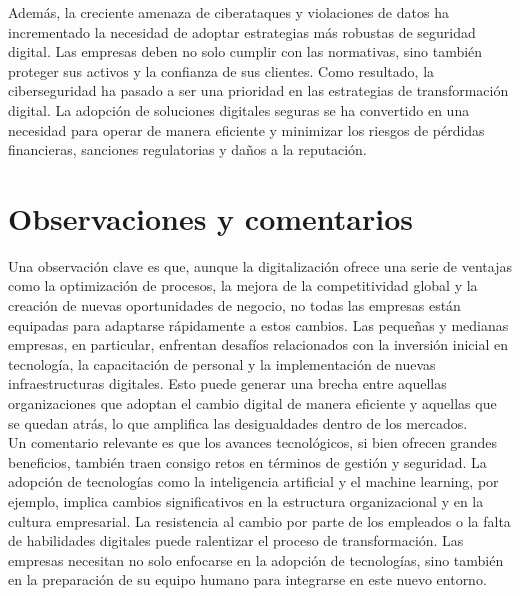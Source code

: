 \documentclass{article}
\begin{document}
Además, la creciente amenaza de ciberataques y violaciones de datos ha incrementado la necesidad de adoptar estrategias más robustas de seguridad digital. Las empresas deben no solo cumplir con las normativas, sino también proteger sus activos y la confianza de sus clientes. Como resultado, la ciberseguridad ha pasado a ser una prioridad en las estrategias de transformación digital. La adopción de soluciones digitales seguras se ha convertido en una necesidad para operar de manera eficiente y minimizar los riesgos de pérdidas financieras, sanciones regulatorias y daños a la reputación.\\

\section{Observaciones y comentarios}
Una observación clave es que, aunque la digitalización ofrece una serie de ventajas como la optimización de procesos, la mejora de la competitividad global y la creación de nuevas oportunidades de negocio, no todas las empresas están equipadas para adaptarse rápidamente a estos cambios. Las pequeñas y medianas empresas, en particular, enfrentan desafíos relacionados con la inversión inicial en tecnología, la capacitación de personal y la implementación de nuevas infraestructuras digitales. Esto puede generar una brecha entre aquellas organizaciones que adoptan el cambio digital de manera eficiente y aquellas que se quedan atrás, lo que amplifica las desigualdades dentro de los mercados.\\

Un comentario relevante es que los avances tecnológicos, si bien ofrecen grandes beneficios, también traen consigo retos en términos de gestión y seguridad. La adopción de tecnologías como la inteligencia artificial y el machine learning, por ejemplo, implica cambios significativos en la estructura organizacional y en la cultura empresarial. La resistencia al cambio por parte de los empleados o la falta de habilidades digitales puede ralentizar el proceso de transformación. Las empresas necesitan no solo enfocarse en la adopción de tecnologías, sino también en la preparación de su equipo humano para integrarse en este nuevo entorno.\\
\end{document}

